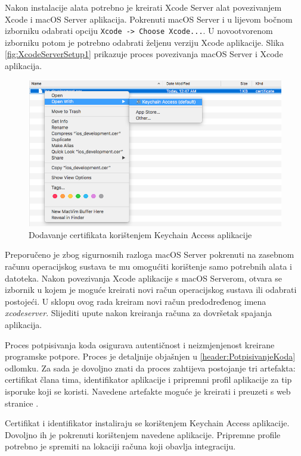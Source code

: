 \documentclass[times, utf8, diplomski, numeric]{fer}
\begin{document}
Nakon instalacije alata potrebno je kreirati Xcode Server alat povezivanjem Xcode i macOS Server aplikacija. Pokrenuti macOS Server i u lijevom bočnom izborniku odabrati opciju \verb|Xcode -> Choose Xcode...|. U novootvorenom izborniku potom je potrebno odabrati željenu verziju Xcode aplikacije. Slika \ref{fig:XcodeServerSetup1} prikazuje proces povezivanja macOS Server i Xcode aplikacija.

\begin{figure}[b!]
\centering
\includegraphics[scale=0.4]{DodavanjeCertifikata}
\caption{Dodavanje certifikata korištenjem Keychain Access aplikacije}
\label{fig:DodavanjeCertifikata}
\end{figure}

Preporučeno je zbog sigurnosnih razloga macOS Server pokrenuti na zasebnom računu operacijskog sustava te mu omogućiti korištenje samo potrebnih alata i datoteka. Nakon povezivanja Xcode aplikacije s macOS Serverom, otvara se izbornik u kojem je moguće kreirati novi račun operacijskog sustava ili odabrati postojeći. U sklopu ovog rada kreiram novi račun predodređenog imena \textit{xcodeserver}. Slijediti upute nakon kreiranja računa za dovršetak spajanja aplikacija.

Proces potpisivanja koda osigurava autentičnost i neizmjenjenost kreirane programske potpore. Proces je detaljnije objašnjen u \ref{header:PotpisivanjeKoda} odlomku. Za sada je dovoljno znati da proces zahtijeva postojanje tri artefakta: certifikat člana tima, identifikator aplikacije i pripremni profil aplikacije za tip isporuke koji se koristi. Navedene artefakte moguće je kreirati i preuzeti s web stranice .

Certifikat i identifikator instaliraju se korištenjem Keychain Access aplikacije. Dovoljno ih je pokrenuti korištenjem navedene aplikacije. Pripremne profile potrebno je spremiti na lokaciji  računa koji obavlja integraciju.
\end{document}
